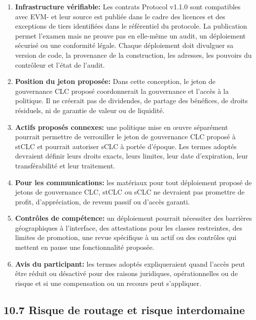 \documentclass[11pt]{article}
\begin{document}
\begin{enumerate}[leftmargin=*]
\item \textbf{Infrastructure vérifiable:} Les contrats Protocol v1.1.0 sont compatibles avec EVM- et leur source est publiée dans le cadre des licences et des exceptions de tiers identifiées dans le référentiel du protocole. La publication permet l'examen mais ne prouve pas en elle-même un audit, un déploiement sécurisé ou une conformité légale. Chaque déploiement doit divulguer sa version de code, la provenance de la construction, les adresses, les pouvoirs du contrôleur et l'état de l'audit.
\item \textbf{Position du jeton proposée:} Dans cette conception, le jeton de gouvernance CLC proposé coordonnerait la gouvernance et l'accès à la politique. Il ne créerait pas de dividendes, de partage des bénéfices, de droits résiduels, ni de garantie de valeur ou de liquidité.
\item \textbf{Actifs proposés connexes:} une politique mise en œuvre séparément pourrait permettre de verrouiller le jeton de gouvernance CLC proposé à stCLC et pourrait autoriser sCLC à portée d'époque. Les termes adoptés devraient définir leurs droits exacts, leurs limites, leur date d'expiration, leur transférabilité et leur traitement.
\item \textbf{Pour les communications:} les matériaux pour tout déploiement proposé de jetons de gouvernance CLC, stCLC ou sCLC ne devraient pas promettre de profit, d'appréciation, de revenu passif ou d'accès garanti.
\item \textbf{Contrôles de compétence:} un déploiement pourrait nécessiter des barrières géographiques à l'interface, des attestations pour les classes restreintes, des limites de promotion, une revue spécifique à un actif ou des contrôles qui mettent en pause une fonctionnalité proposée.
\item \textbf{Avis du participant:} les termes adoptés expliqueraient quand l'accès peut être réduit ou désactivé pour des raisons juridiques, opérationnelles ou de risque et si une compensation ou un recours peut s'appliquer.
\end{enumerate}
\subsection*{10.7 Risque de routage et risque interdomaine}
\end{document}
